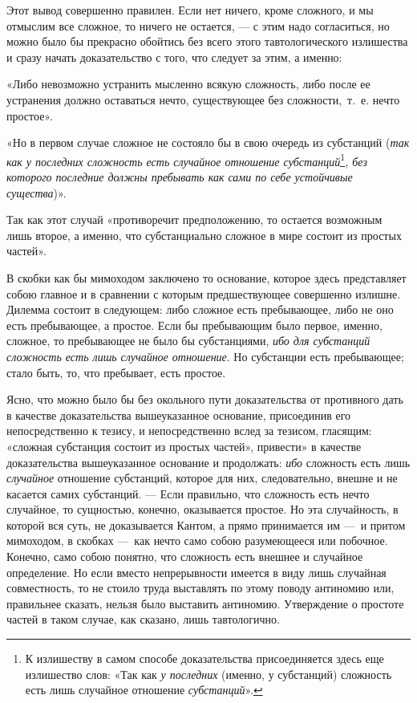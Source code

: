 Этот вывод совершенно правилен. Если нет ничего, кроме сложного, и мы
отмыслим все сложное, то ничего не остается, — с этим надо согласиться, но
можно было бы прекрасно обойтись без всего этого тавтологического
излишества и сразу начать доказательство с того, что следует за этим, а
именно:

«Либо невозможно устранить мысленно всякую сложность, либо после ее
устранения должно оставаться нечто, существующее без сложности,~т.~е. нечто
простое».

«Но в первом случае сложное не состояло бы в свою очередь из субстанций
({\em так как у последних сложность есть случайное
отношение субстанций}\footnote{К излишеству в самом способе
доказательства присоединяется здесь еще излишество слов: «Так как
{\em у последних} (именно, у субстанций) сложность есть лишь случайное
отношение {\em субстанций}».}{\em , без которого последние должны
пребывать как сами по себе устойчивые существа})».

Так как этот случай «противоречит предположению, то остается возможным лишь
второе, а именно, что субстанциально сложное в мире состоит из простых
частей».

В скобки как бы мимоходом заключено то основание, которое здесь представляет
собою главное и в сравнении с которым предшествующее совершенно излишне.
Дилемма состоит в следующем: либо сложное есть пребывающее, либо не оно
есть пребывающее, а простое. Если бы пребывающим было первое, именно,
сложное, то пребывающее не было бы субстанциями,
{\em ибо для субстанций сложность есть лишь случайное
отношение}. Но субстанции есть пребывающее; стало быть, то, что пребывает,
есть простое.

Ясно, что можно было бы без окольного пути доказательства от противного дать
в качестве доказательства вышеуказанное основание, присоединив его
непосредственно к тезису, и непосредственно вслед за тезисом, гласящим:
«сложная субстанция состоит из простых частей», привести» в качестве
доказательства вышеуказанное основание и продолжать:
{\em ибо} сложность есть лишь
{\em случайное} отношение субстанций, которое для них,
следовательно, внешне и не касается самих субстанций. — Если правильно, что
сложность есть нечто случайное, то сущностью, конечно, оказывается простое.
Но эта случайность, в которой вся суть, не доказывается Кантом, а прямо
принимается им —~и притом мимоходом, в скобках —~как нечто само собою
разумеющееся или побочное. Конечно, само собою понятно, что сложность есть
внешнее и случайное определение. Но если вместо непрерывности имеется в
виду лишь случайная совместность, то не стоило труда выставлять по этому
поводу антиномию или, правильнее сказать, нельзя было выставить антиномию.
Утверждение о простоте частей в таком случае, как сказано, лишь
тавтологично.


